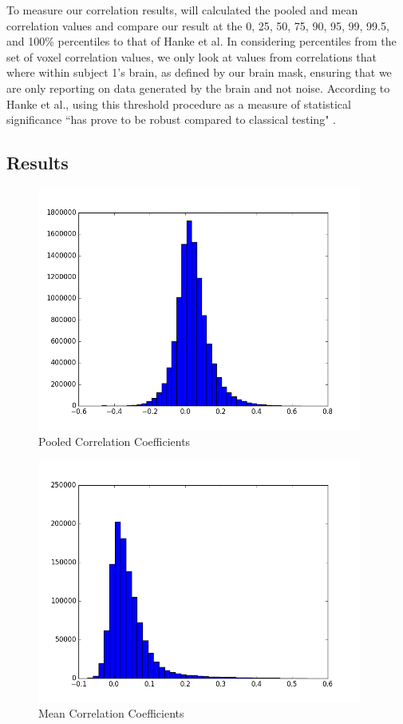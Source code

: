 \documentclass[11pt]{article}
\begin{document}
To measure our correlation results, will calculated the pooled and mean correlation values and compare our result at the 0, 25, 50, 75, 90, 95, 99, 99.5, 
and 100\% percentiles to that of Hanke et al. In considering percentiles from the set of voxel correlation values, we only look at values from correlations that where within subject 1's brain, as defined by our brain mask, ensuring that we are only reporting on data generated by the brain and not noise. According to
Hanke et al., using this threshold procedure as a measure of statistical 
significance ``has prove to be robust compared to classical testing" \cite{hank2014audiomovie}.

\subsection{Results}
\begin{figure}[H]                                                               
\caption{Pooled Correlation Coefficients}
\centering                                                                      
\includegraphics[height=8cm]{pooled_correlation_histogram}
\end{figure}  
\begin{figure}[H]                                                               
\caption{Mean Correlation Coefficients}
\centering                                                                      
\includegraphics[height=8cm]{mean_correlation_histogram}                            
\end{figure}  
\end{document}
